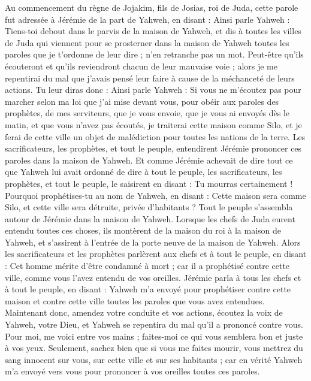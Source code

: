 \begin{multicols}{2}
\VerseOne{}Au commencement du règne de Jojakim, fils de Josias, roi de Juda, cette parole fut adressée à Jérémie de la part de Yahweh, en disant :
Ainsi parle Yahweh : Tiens-toi debout dans le parvis de la maison de Yahweh, et dis à toutes les villes de Juda qui viennent pour se prosterner dans la maison de Yahweh toutes les paroles que je t'ordonne de leur dire ; n'en retranche pas un mot.
Peut-être qu'ils écouteront et qu'ils reviendront chacun de leur mauvaise voie ; alors je me repentirai du mal que j'avais pensé leur faire à cause de la méchanceté de leurs actions.
Tu leur diras donc : Ainsi parle Yahweh : Si vous ne m'écoutez pas pour marcher selon ma loi que j'ai mise devant vous,
pour obéir aux paroles des prophètes, de mes serviteurs, que je vous envoie, que je vous ai envoyés dès le matin, et que vous n'avez pas écoutés,
je traiterai cette maison comme Silo, et je ferai de cette ville un objet de malédiction pour toutes les nations de la terre.
Les sacrificateurs, les prophètes, et tout le peuple, entendirent Jérémie prononcer ces paroles dans la maison de Yahweh.
Et comme Jérémie achevait de dire tout ce que Yahweh lui avait ordonné de dire à tout le peuple, les sacrificateurs, les prophètes, et tout le peuple, le saisirent en disant : Tu mourras certainement !
Pourquoi prophétises-tu au nom de Yahweh, en disant : Cette maison sera comme Silo, et cette ville sera détruite, privée d'habitants ? Tout le peuple s'assembla autour de Jérémie dans la maison de Yahweh.
Lorsque les chefs de Juda eurent entendu toutes ces choses, ils montèrent de la maison du roi à la maison de Yahweh, et s'assirent à l'entrée de la porte neuve de la maison de Yahweh.
Alors les sacrificateurs et les prophètes parlèrent aux chefs et à tout le peuple, en disant : Cet homme mérite d'être condamné à mort ; car il a prophétisé contre cette ville, comme vous l'avez entendu de vos oreilles.
Jérémie parla à tous les chefs et à tout le peuple, en disant : Yahweh m'a envoyé pour prophétiser contre cette maison et contre cette ville toutes les paroles que vous avez entendues.
Maintenant donc, amendez votre conduite et vos actions, écoutez la voix de Yahweh, votre Dieu, et Yahweh se repentira du mal qu'il a prononcé contre vous.
Pour moi, me voici entre vos mains ; faites-moi ce qui vous semblera bon et juste à vos yeux.
Seulement, sachez bien que si vous me faites mourir, vous mettrez du sang innocent sur vous, sur cette ville et sur ses habitants ; car en vérité Yahweh m'a envoyé vers vous pour prononcer à vos oreilles toutes ces paroles.

\end{multicols}
